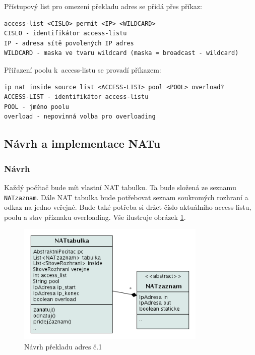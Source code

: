 Přístupový list pro omezení překladu adres se přidá přes příkaz:
\begin{verbatim}
access-list <CISLO> permit <IP> <WILDCARD>
CISLO - identifikátor access-listu
IP - adresa sítě povolených IP adres
WILDCARD - maska ve tvaru wildcard (maska = broadcast - wildcard)
\end{verbatim}

Přiřazení poolu k~access-listu se provadí příkazem:
\begin{verbatim}
ip nat inside source list <ACCESS-LIST> pool <POOL> overload?
ACCESS-LIST - identifikátor access-listu
POOL - jméno poolu
overload - nepovinná volba pro overloading
\end{verbatim} 


\subsection{Návrh a implementace NATu}

\subsubsection{Návrh}
Každý počítač bude mít vlastní NAT tabulku. Ta bude složená ze seznamu \verb|NATzaznam|. Dále NAT tabulka bude potřebovat seznam soukromých rozhraní a odkaz na jedno veřejné. Bude také potřeba si držet číslo aktuálního access-listu, poolu a stav příznaku overloading. Vše ilustruje obrázek \ref{fig:nat_navrh1}.

\begin{figure}[h]
\begin{center}
\includegraphics[width=9cm]{figures/nat_navrh1}
\caption{Návrh překladu adres č.1}
\label{fig:nat_navrh1}
\end{center}
\end{figure}


